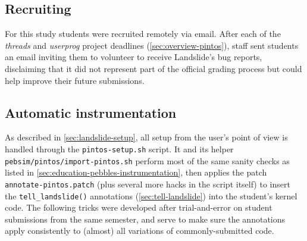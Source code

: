 \subsection{Recruiting}

For this study students were recruited remotely via email.
After each of the {\em threads} and {\em userprog} project deadlines (\cref{sec:overview-pintos}),
\uchos staff sent students an email inviting them to volunteer to receive Landslide's bug reports,
disclaiming that it did not represent part of the official grading process but could help improve their future submissions.

\subsection{Automatic instrumentation}
\label{sec:education-pintos-instrumentation}

As described in \cref{sec:landslide-setup},
all setup from the user's point of view is handled through the {\tt pintos-setup.sh} script.
It
and its helper {\tt pebsim/pintos/import-pintos.sh}
perform most of the same sanity checks as listed in \cref{sec:education-pebbles-instrumentation},
then applies the patch {\tt annotate-\allowbreak{}pintos.patch}
(plus several more hacks in the script itself)
to insert the {\tt tell\_landslide()} annotations (\cref{sec:tell-landslide})
into the student's kernel code.
The following tricks were developed after trial-and-error on student submissions from the same semester,
and serve to make sure the annotations apply consistently
to (almost) all variations of commonly-submitted code.


